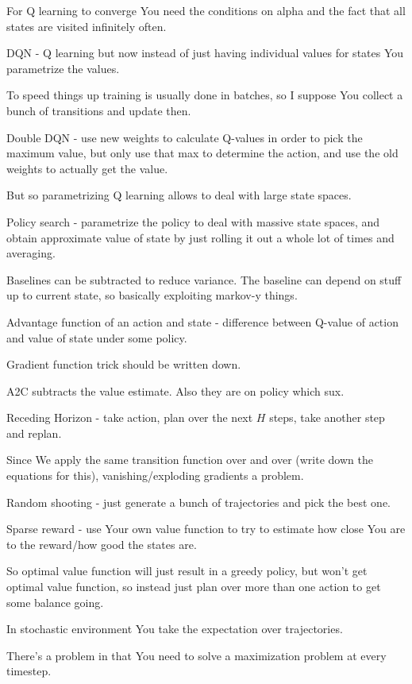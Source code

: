 \documentclass{article}
\begin{document}
		For Q learning to converge You need the conditions on alpha and the fact that all states are visited infinitely often.
		
		DQN - Q learning but now instead of just having individual values for states You parametrize the values. 
		
		To speed things up training is usually done in batches, so I suppose You collect a bunch of transitions and update then.
		
		Double DQN - use new weights to calculate Q-values in order to pick the maximum value, but only use that max to determine the action, and use the old weights to actually get the value.
		
		But so parametrizing Q learning allows to deal with large state spaces.
		
		Policy search - parametrize the policy to deal with massive state spaces, and obtain approximate value of state by just rolling it out a whole lot of times and averaging.
		
		Baselines can be subtracted to reduce variance. The baseline can depend on stuff up to current state, so basically exploiting markov-y things.		
		
		Advantage function of an action and state - difference between Q-value of action and value of state under some policy.
		
		Gradient function trick should be written down.
		
		A2C subtracts the value estimate. Also they are on policy which sux.
		
		
		Receding Horizon - take action, plan over the next $H$ steps, take another step and replan.
		
		Since We apply the same transition function over and over (write down the equations for this), vanishing/exploding gradients a problem.
		
		Random shooting - just generate a bunch of trajectories and pick the best one.
		
		Sparse reward - use Your own value function to try to estimate how close You are to the reward/how good the states are.
		
		So optimal value function will just result in a greedy policy, but won't get optimal value function, so instead just plan over more than one action to get some balance going.
		
		In stochastic environment You take the expectation over trajectories.
		
		There's a problem in that You need to solve a maximization problem at every timestep.
		
\end{document}

